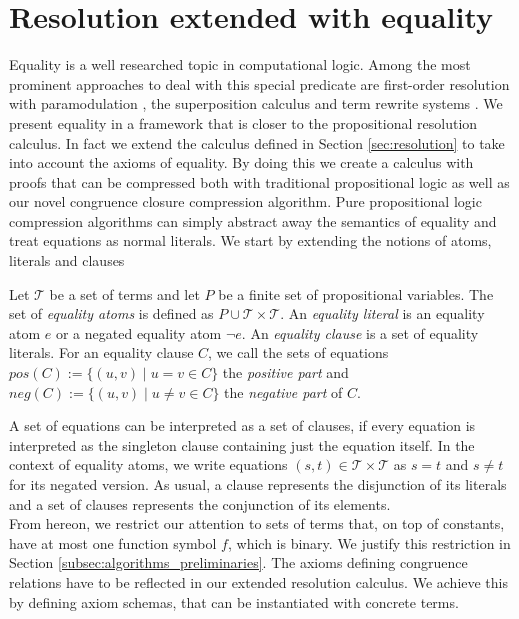 \section{Resolution extended with equality}
\label{sec:calculus}

Equality is a well researched topic in computational logic.
Among the most prominent approaches to deal with this special predicate are first-order resolution with paramodulation \cite{Robinson1969}, the superposition calculus \cite{Nieuwenhuis2001} and term rewrite systems \cite{Baader1998}.
We present equality in a framework that is closer to the propositional resolution calculus.
In fact we extend the calculus defined in Section \ref{sec:resolution} to take into account the axioms of equality.
By doing this we create a calculus with proofs that can be compressed both with traditional propositional logic as well as our novel congruence closure compression algorithm.
Pure propositional logic compression algorithms can simply abstract away the semantics of equality and treat equations as normal literals.
We start by extending the notions of atoms, literals and clauses

\begin{definition}

Let $\mathcal{T}$ be a set of terms and let $P$ be a finite set of propositional variables.
The set of \emph{equality atoms} is defined as $P \cup \mathcal{T} \times \mathcal{T}$.
An \emph{equality literal} is an equality atom $e$ or a negated equality atom $\neg e$.
An \emph{equality clause} is a set of equality literals.
For an equality clause $C$, we call the sets of equations $pos(C) := \{(u,v) \mid u = v \in C\}$ the \emph{positive part} and $neg(C) := \{(u,v) \mid u \neq v \in C\}$ the \emph{negative part} of $C$.

\end{definition}

A set of equations can be interpreted as a set of clauses, if every equation is interpreted as the singleton clause containing just the equation itself.
In the context of equality atoms, we write equations $(s,t) \in \mathcal{T} \times \mathcal{T}$ as $s = t$ and $s \neq t$ for its negated version.
As usual, a clause represents the disjunction of its literals and a set of clauses represents the conjunction of its elements.\\

From hereon, we restrict our attention to sets of terms that, on top of constants, have at most one function symbol $f$, which is binary.
We justify this restriction in Section \ref{subsec:algorithms_preliminaries}.
The axioms defining congruence relations have to be reflected in our extended resolution calculus.
We achieve this by defining axiom schemas, that can be instantiated with concrete terms.

